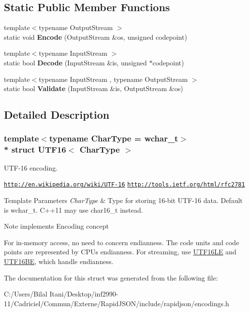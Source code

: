 \subsection*{Static Public Member Functions}
\begin{DoxyCompactItemize}
\item 
{\footnotesize template$<$typename Output\+Stream $>$ }\\static void {\bfseries Encode} (Output\+Stream \&os, unsigned codepoint)\hypertarget{struct_u_t_f16_a9d8ded01244e30d037c4afa10ee2b30e}{}\label{struct_u_t_f16_a9d8ded01244e30d037c4afa10ee2b30e}

\item 
{\footnotesize template$<$typename Input\+Stream $>$ }\\static bool {\bfseries Decode} (Input\+Stream \&is, unsigned $\ast$codepoint)\hypertarget{struct_u_t_f16_a124c79dfd9f9b4c3fb65bd55ba17b4be}{}\label{struct_u_t_f16_a124c79dfd9f9b4c3fb65bd55ba17b4be}

\item 
{\footnotesize template$<$typename Input\+Stream , typename Output\+Stream $>$ }\\static bool {\bfseries Validate} (Input\+Stream \&is, Output\+Stream \&os)\hypertarget{struct_u_t_f16_a7516184ed5dce10c0e7895bec124d97d}{}\label{struct_u_t_f16_a7516184ed5dce10c0e7895bec124d97d}

\end{DoxyCompactItemize}


\subsection{Detailed Description}
\subsubsection*{template$<$typename Char\+Type = wchar\+\_\+t$>$\\*
struct U\+T\+F16$<$ Char\+Type $>$}

U\+T\+F-\/16 encoding. 

\href{http://en.wikipedia.org/wiki/UTF-16}{\tt http\+://en.\+wikipedia.\+org/wiki/\+U\+T\+F-\/16} \href{http://tools.ietf.org/html/rfc2781}{\tt http\+://tools.\+ietf.\+org/html/rfc2781} 
\begin{DoxyTemplParams}{Template Parameters}
{\em Char\+Type} & Type for storing 16-\/bit U\+T\+F-\/16 data. Default is wchar\+\_\+t. C++11 may use char16\+\_\+t instead. \\
\hline
\end{DoxyTemplParams}
\begin{DoxyNote}{Note}
implements Encoding concept

For in-\/memory access, no need to concern endianness. The code units and code points are represented by C\+PU\textquotesingle{}s endianness. For streaming, use \hyperlink{struct_u_t_f16_l_e}{U\+T\+F16\+LE} and \hyperlink{struct_u_t_f16_b_e}{U\+T\+F16\+BE}, which handle endianness. 
\end{DoxyNote}


The documentation for this struct was generated from the following file\+:\begin{DoxyCompactItemize}
\item 
C\+:/\+Users/\+Bilal Itani/\+Desktop/inf2990-\/11/\+Cadriciel/\+Commun/\+Externe/\+Rapid\+J\+S\+O\+N/include/rapidjson/encodings.\+h\end{DoxyCompactItemize}
